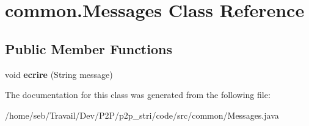 \hypertarget{classcommon_1_1Messages}{}\section{common.\+Messages Class Reference}
\label{classcommon_1_1Messages}
\subsection*{Public Member Functions}
\begin{DoxyCompactItemize}
\item 
\mbox{\label{classcommon_1_1Messages_a5b24070c575f1aa7e4491db487f5dadb}} 
void {\bfseries ecrire} (String message)
\end{DoxyCompactItemize}


The documentation for this class was generated from the following file\+:\begin{DoxyCompactItemize}
\item 
/home/seb/\+Travail/\+Dev/\+P2\+P/p2p\+\_\+stri/code/src/common/Messages.\+java\end{DoxyCompactItemize}
